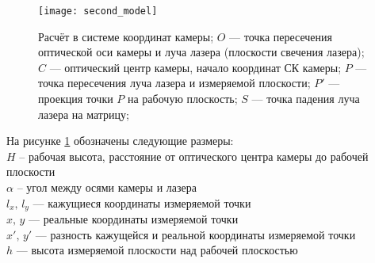             \begin{figure}[H]
                \centering
                \texttt{[image: second\_model]}
                \caption{Расчёт в системе координат камеры;
                         $O$ --- точка пересечения оптической оси камеры и луча лазера (плоскости свечения лазера);
                         $C$ --- оптический центр камеры, начало координат СК камеры;
                         $P$ --- точка пересечения луча лазера и измеряемой плоскости;
                         $P'$ --- проекция точки $ P $ на рабочую плоскость;
                         $S$ --- точка падения луча лазера на матрицу;
                         }
                 \label{pic:second_model}
            \end{figure}
            
            На рисунке \ref{pic:second_model} обозначены следующие размеры:\\
            $ H $ -- рабочая высота, расстояние от оптического центра камеры до рабочей плоскости\\
            $ \alpha $ -- угол между осями камеры и лазера\\
            $l_x,\,l_y$ --- кажущиеся координаты измеряемой точки\\
            $x,\,y$ --- реальные координаты измеряемой точки\\
            $x',\,y'$ --- разность кажущейся и реальной координаты измеряемой точки\\
            $h$ --- высота измеряемой плоскости над рабочей плоскостью
            

